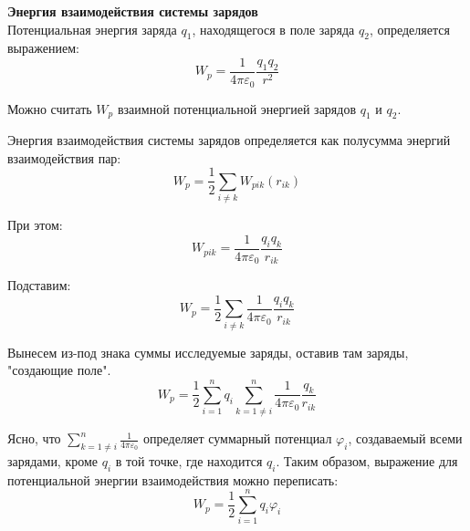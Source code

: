 \documentclass{article}
\begin{document}
	\textbf{Энергия взаимодействия системы зарядов}\\
	
	Потенциальная энергия заряда $q_1$, находящегося в поле заряда $q_2$, определяется выражением:
	\begin{equation}
		W_p = \frac{1}{4\pi\varepsilon_0}\frac{q_1q_2}{r^2}
	\end{equation}

	Можно считать $W_p$ взаимной потенциальной энергией зарядов $q_1$ и $q_2$. 

	Энергия взаимодействия системы зарядов определяется как полусумма энергий взаимодействия пар:
	\begin{equation}
		W_{p} = \frac{1}{2}\sum_{i\neq k}W_{pik}(r_{ik})
	\end{equation}

	При этом:
	\begin{equation}
		W_{pik} = \frac{1}{4\pi\varepsilon_0}\frac{q_iq_k}{r_{ik}}
	\end{equation}

	Подставим:
	\begin{equation}
		W_p = \frac{1}{2}\sum_{i\neq k}\frac{1}{4\pi\varepsilon_0}\frac{q_iq_k}{r_{ik}}
	\end{equation}

	Вынесем из-под знака суммы исследуемые заряды, оставив там заряды, "создающие поле".
	\begin{equation}
		W_p = \frac{1}{2}\sum_{i=1}^nq_i\sum_{k=1\neq i}^n\frac{1}{4\pi\varepsilon_0}\frac{q_k}{r_{ik}}
	\end{equation}

	Ясно, что $\sum_{k=1\neq i}^n\frac{1}{4\pi\varepsilon_0}$ определяет суммарный потенциал $\varphi_i$, создаваемый всеми зарядами, кроме $q_i$ в той точке, где находится $q_i$. Таким образом, выражение для потенциальной энергии взаимодействия можно переписать:
	\begin{equation}
		W_p = \frac{1}{2}\sum_{i=1}^n q_i\varphi_i
	\end{equation}
\end{document}
